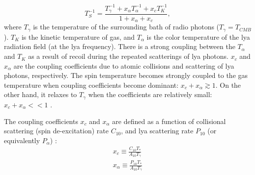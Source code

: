 \documentclass[12pt, TexShade, letterpaper]{report}
\begin{document}
\begin{equation}
    T^{-1}_S = \frac{T^{-1}_\gamma + x_\alpha T^{-1}_\alpha + x_c T^{-1}_K}{1 + x_\alpha + x_c}, \label{eq:spin_temperature_coupling}
\end{equation}
where $T_\gamma$ is the temperature of the surrounding bath of radio photons ($T_\gamma = T_{CMB}$). $T_K$ is the kinetic temperature of gas, and $T_\alpha$ is the color temperature of the \gls{lya} radiation field (at the \gls{lya} frequency). There is a strong coupling between the $T_\alpha$ and $T_K$ as a result of recoil during the repeated scatterings of \gls{lya} photons. $x_c$ and $x_\alpha$ are the coupling coefficients due to atomic collisions and scattering of \gls{lya} photons, respectively. The spin temperature becomes strongly coupled to the gas temperature when coupling coefficients become dominant: $x_c + x_\alpha \gtrsim 1$. On the other hand, it relaxes to $T_\gamma$ when the coefficients are relatively small: $x_c + x_\alpha << 1$ \cite{21century, low_frequency}. \par
The coupling coefficients $x_c$ and $x_\alpha$ are defined as a function of collisional scattering (spin de-excitation) rate $C_{10}$, and \gls{lya} scattering rate $P_{10}$ (or equivalently $P_\alpha$) \cite{explore_cosmic_dawn, low_frequency}:
\begin{gather}
    x_c \equiv \frac{C_{10}T_*}{A_{10}T_\gamma}\\
    x_\alpha \equiv \frac{P_{10} T_*}{A_{10}T_\gamma} \label{eq:x_a}
\end{gather}
\end{document}
